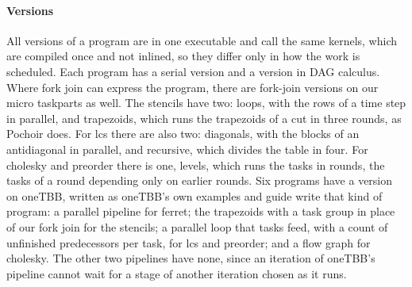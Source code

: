 \documentclass[sigplan,nonacm]{acmart}
\begin{document}
\paragraph{Versions}
%
All versions of a program are in one executable and call the same
kernels, which are compiled once and not inlined, so they differ only
in how the work is scheduled.
%
Each program has a serial version and a version in DAG calculus.
%
Where fork join can express the program, there are fork-join versions
on our micro taskparts as well.
%
The stencils have two: loops, with the rows of a time step in
parallel, and trapezoids, which runs the trapezoids of a cut in three
rounds, as Pochoir does.
%
For lcs there are also two: diagonals, with the blocks of an
antidiagonal in parallel, and recursive, which divides the table in
four.
%
For cholesky and preorder there is one, levels, which runs the tasks
in rounds, the tasks of a round depending only on earlier rounds.
%
Six programs have a version on oneTBB, written as oneTBB's own
examples and guide write that kind of program: a parallel pipeline for
ferret; the trapezoids with a task group in place of our fork join for
the stencils; a parallel loop that tasks feed, with a count of
unfinished predecessors per task, for lcs and preorder; and a flow
graph for cholesky.
%
The other two pipelines have none, since an iteration of oneTBB's
pipeline cannot wait for a stage of another iteration chosen as it
runs.
\end{document}
